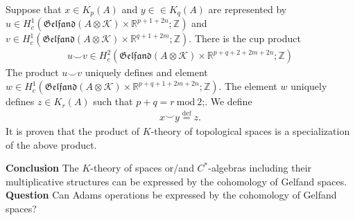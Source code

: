 \documentclass{beamer}
\theoremstyle{plain}
\newcommand{\Z}{\mathbb{Z}}
\newcommand{\bean}{\begin{eqnarray*}}
\newcommand{\eean}{\end{eqnarray*}}
\newcommand{\R}{\mathbb{R}}
\newcommand{\K}{\mathcal{K}}
\newcommand{\bydef}{\stackrel{\mathrm{def}}{=}}
\begin{document}
\begin{frame}
	Suppose that $x \in K_p\left( A\right)$  and $y \in  \in K_q\left( A\right)$ are represented by $u \in H^1_c\left(\mathfrak{Gelfand}\left(A \otimes \K\right)\times \R^{p + 1 + 2n}; \Z \right)$ and $v \in H^1_c\left(\mathfrak{Gelfand}\left(A \otimes \K\right)\times \R^{q + 1 + 2m}; \Z \right)$.
	There is the cup product
	\bean
	u \smile v \in H^2_c\left(\mathfrak{Gelfand}\left(A \otimes \K\right)\times \R^{p+ q + 2 + 2m + 2n}; \Z \right)
	\eean
	The product  $u \smile v$ uniquely defines and element $w \in H^1_c\left(\mathfrak{Gelfand}\left(A \otimes \K\right)\times \R^{p+ q + 1 + 2m + 2n}; \Z \right)$. The element $w$ uniquely defines $z \in K_r\left( A\right)$ such that $p + q = r~\mathrm{mod}~2$;. We define
	\bean
	x \smile y \bydef z.
	\eean 
	It is proven that the product of $K$-theory of topological spaces is a specialization of the above product.
	
	{\bf Conclusion } \alert{The $K$-theory of spaces or/and $C^*$-algebras including their multiplicative structures can be expressed by the cohomology of Gelfand spaces}.\\
		{\bf Question } \alert{Can Adams operations be expressed by the cohomology of Gelfand spaces?}
	
\end{frame}
\end{document}
